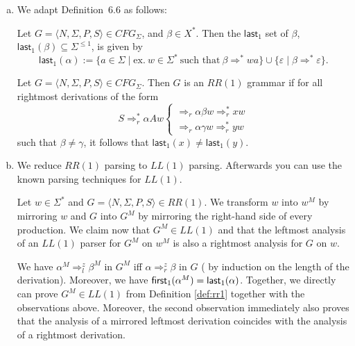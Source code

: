 \begin{solution}
    \begin{enumerate}[a)]
        \item We adapt Definition~6.6 as follows:
        \begin{mydef}
            Let $G=\langle N,\Sigma, P, S\rangle \in CFG_{\Sigma}$, and $\beta \in X^*$. Then the $\textsf{last}_1$ set of $\beta$, $\textsf{last}_1(\beta) \subseteq \Sigma^{\leq 1}$, is given by
            \[ \textsf{last}_1(\alpha) := \{ a \in \Sigma \mid \text{ex.}~w \in \Sigma^* ~\text{such that}~ \beta \Rightarrow^* wa\} \cup \{ \varepsilon \mid \beta \Rightarrow^* \varepsilon \}. \]
        \end{mydef}

        \begin{mydef}[RR(1)]\label{def:rr1}
            Let $G=\langle N,\Sigma, P, S\rangle \in CFG_{\Sigma}$. Then $G$ is an $RR(1)$ grammar if for all rightmost derivations of the form
            \[ S \Rightarrow_r^* \alpha A w \begin{cases}
                \Rightarrow_r \alpha \beta w \Rightarrow_r^* xw \\
                \Rightarrow_r \alpha \gamma w \Rightarrow_r^* yw
            \end{cases}\]
            such that $\beta \neq \gamma$, it follows that $\textsf{last}_1(x) \neq \textsf{last}_1(y)$.           
        \end{mydef}

        \item We reduce $RR(1)$ parsing to $LL(1)$ parsing. Afterwards you can use the known parsing techniques for $LL(1)$.
        
        Let $w \in \Sigma^*$ and $G = \langle N,\Sigma, P, S\rangle \in RR(1)$. We transform $w$ into $w^M$ by mirroring $w$ and $G$ into $G^M$ by mirroring the right-hand side of every production. We claim now that $G^M \in LL(1)$ and that the leftmost analysis of an $LL(1)$ parser for $G^M$ on $w^M$ is also a rightmost analysis for $G$ on $w$.
        
        We have  $\alpha^M \Rightarrow_l^z \beta^M$ in $G^M$ iff $\alpha \Rightarrow_r^z \beta$  in $G$ ( by induction on the length of the derivation). Moreover, we have $\textsf{first}_1(\alpha ^M) = \textsf{last}_1(\alpha)$.
        Together, we directly can prove $G^M \in LL(1)$ from Definition \ref{def:rr1} together with the observations above. Moreover, the second observation immediately also proves that the analysis of a mirrored leftmost derivation coincides with the analysis of a rightmost derivation. 
    \end{enumerate}
\end{solution}